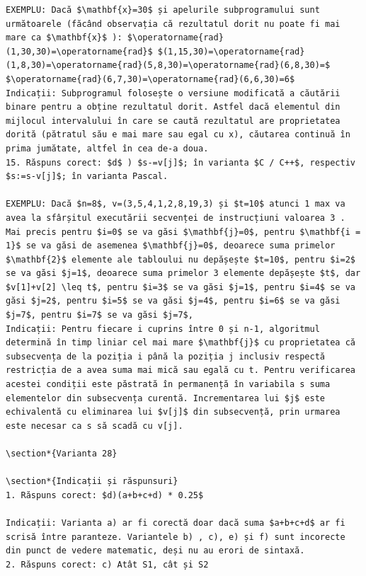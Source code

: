 \documentclass[10pt]{article}
\begin{document}
\begin{verbatim}
EXEMPLU: Dacă $\mathbf{x}=30$ și apelurile subprogramului sunt următoarele (făcând observația că rezultatul dorit nu poate fi mai mare ca $\mathbf{x}$ ): $\operatorname{rad}(1,30,30)=\operatorname{rad}$ $(1,15,30)=\operatorname{rad}(1,8,30)=\operatorname{rad}(5,8,30)=\operatorname{rad}(6,8,30)=$ $\operatorname{rad}(6,7,30)=\operatorname{rad}(6,6,30)=6$
Indicații: Subprogramul folosește o versiune modificată a căutării binare pentru a obține rezultatul dorit. Astfel dacă elementul din mijlocul intervalului în care se caută rezultatul are proprietatea dorită (pătratul său e mai mare sau egal cu x), căutarea continuă în prima jumătate, altfel în cea de-a doua.
15. Răspuns corect: $d$ ) $s-=v[j]$; în varianta $C / C++$, respectiv $s:=s-v[j]$; în varianta Pascal.

EXEMPLU: Dacă $n=8$, v=(3,5,4,1,2,8,19,3) și $t=10$ atunci 1 max va avea la sfârșitul executării secvenței de instrucțiuni valoarea 3 . Mai precis pentru $i=0$ se va găsi $\mathbf{j}=0$, pentru $\mathbf{i = 1}$ se va găsi de asemenea $\mathbf{j}=0$, deoarece suma primelor $\mathbf{2}$ elemente ale tabloului nu depășește $t=10$, pentru $i=2$ se va găsi $j=1$, deoarece suma primelor 3 elemente depășește $t$, dar $v[1]+v[2] \leq t$, pentru $i=3$ se va găsi $j=1$, pentru $i=4$ se va găsi $j=2$, pentru $i=5$ se va găsi $j=4$, pentru $i=6$ se va găsi $j=7$, pentru $i=7$ se va găsi $j=7$,
Indicații: Pentru fiecare i cuprins între 0 și n-1, algoritmul determină în timp liniar cel mai mare $\mathbf{j}$ cu proprietatea că subsecvența de la poziția i până la poziția j inclusiv respectă restricția de a avea suma mai mică sau egală cu t. Pentru verificarea acestei condiții este păstrată în permanență în variabila s suma elementelor din subsecvența curentă. Incrementarea lui $j$ este echivalentă cu eliminarea lui $v[j]$ din subsecvență, prin urmarea este necesar ca s să scadă cu v[j].

\section*{Varianta 28}

\section*{Indicații și răspunsuri}
1. Răspuns corect: $d)(a+b+c+d) * 0.25$

Indicații: Varianta a) ar fi corectă doar dacă suma $a+b+c+d$ ar fi scrisă între paranteze. Variantele b) , c), e) și f) sunt incorecte din punct de vedere matematic, deși nu au erori de sintaxă.
2. Răspuns corect: c) Atât S1, cât și S2


\end{verbatim}
\end{document}
